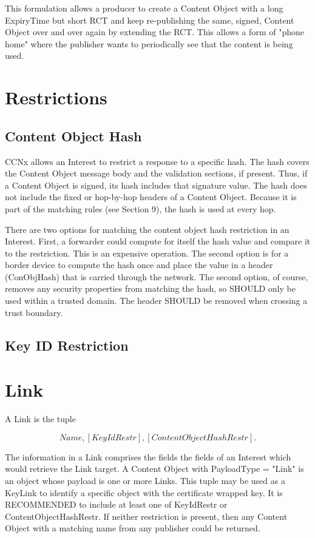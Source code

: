 \documentclass[12pt]{article}
\begin{document}
This formulation allows a producer to create a Content Object with a
long ExpiryTime but short RCT and keep re-publishing the same,
signed, Content Object over and over again by extending the RCT.
This allows a form of "phone home" where the publisher wants to
periodically see that the content is being used.

\section{Restrictions}

\subsection{Content Object Hash}
CCNx allows an Interest to restrict a response to a specific hash.
The hash covers the Content Object message body and the validation
sections, if present.  Thus, if a Content Object is signed, its hash
includes that signature value.  The hash does not include the fixed
or hop-by-hop headers of a Content Object.  Because it is part of the
matching rules (see Section 9), the hash is used at every hop.

There are two options for matching the content object hash
restriction in an Interest.  First, a forwarder could compute for
itself the hash value and compare it to the restriction.  This is an
expensive operation.  The second option is for a border device to
compute the hash once and place the value in a header (ConObjHash)
that is carried through the network.  The second option, of course,
removes any security properties from matching the hash, so SHOULD
only be used within a trusted domain.  The header SHOULD be removed
when crossing a trust boundary.

\subsection{Key ID Restriction}

\section{Link}
A Link is the tuple

$$
{Name, [KeyIdRestr], [ContentObjectHashRestr]}.
$$

The information in a Link comprises the fields the fields of an
Interest which would retrieve the Link target.  A Content Object with
PayloadType = "Link" is an object whose payload is one or more Links.
This tuple may be used as a KeyLink to identify a specific object
with the certificate wrapped key.  It is RECOMMENDED to include at
least one of KeyIdRestr or ContentObjectHashRestr.  If neither
restriction is present, then any Content Object with a matching name
from any publisher could be returned.
\end{document}

